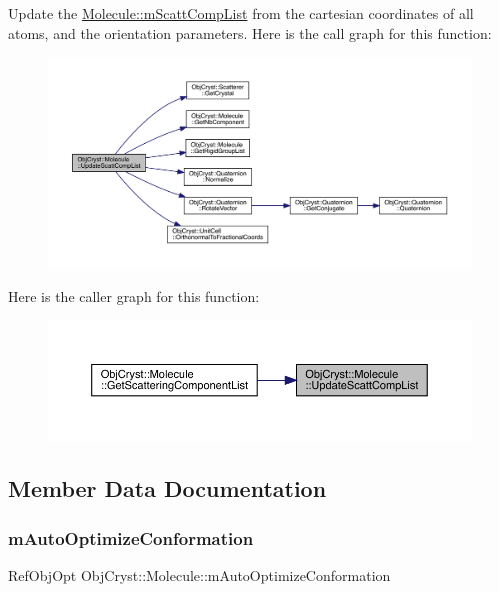Update the \mbox{\hyperlink{class_obj_cryst_1_1_molecule_ae681f50b04c32c7139727c675dc04b67}{Molecule\+::m\+Scatt\+Comp\+List}} from the cartesian coordinates of all atoms, and the orientation parameters. Here is the call graph for this function\+:
\nopagebreak
\begin{figure}[H]
\begin{center}
\leavevmode
\includegraphics[width=350pt]{class_obj_cryst_1_1_molecule_a53e8b1249d2f489fd71f06612cde0bd4_cgraph}
\end{center}
\end{figure}
Here is the caller graph for this function\+:
\nopagebreak
\begin{figure}[H]
\begin{center}
\leavevmode
\includegraphics[width=350pt]{class_obj_cryst_1_1_molecule_a53e8b1249d2f489fd71f06612cde0bd4_icgraph}
\end{center}
\end{figure}


\subsection{Member Data Documentation}
\mbox{\label{class_obj_cryst_1_1_molecule_ae8459b9f767b0d8bc27b05140c604e0c}} 
\subsubsection{\texorpdfstring{mAutoOptimizeConformation}{mAutoOptimizeConformation}}
{\footnotesize\ttfamily Ref\+Obj\+Opt Obj\+Cryst\+::\+Molecule\+::m\+Auto\+Optimize\+Conformation}

